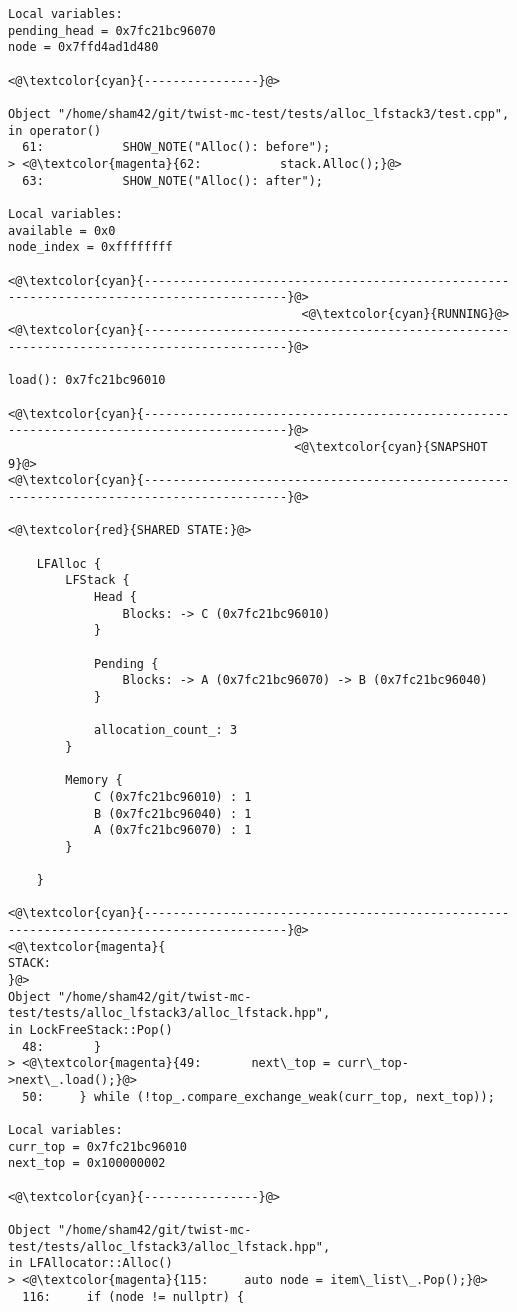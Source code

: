 \begin{adjustwidth}{-3.3cm}{-1cm}
\begin{allintypewriter}
\begin{multicols*}{2}
\begin{lstlisting}[numbers=none]
Local variables: 
pending_head = 0x7fc21bc96070
node = 0x7ffd4ad1d480

<@\textcolor{cyan}{----------------}@>

Object "/home/sham42/git/twist-mc-test/tests/alloc_lfstack3/test.cpp",
in operator()
  61:           SHOW_NOTE("Alloc(): before");
> <@\textcolor{magenta}{62:           stack.Alloc();}@>
  63:           SHOW_NOTE("Alloc(): after");

Local variables: 
available = 0x0
node_index = 0xffffffff

<@\textcolor{cyan}{------------------------------------------------------------------------------------------}@>
                                         <@\textcolor{cyan}{RUNNING}@>
<@\textcolor{cyan}{------------------------------------------------------------------------------------------}@>

load(): 0x7fc21bc96010

<@\textcolor{cyan}{------------------------------------------------------------------------------------------}@>
                                        <@\textcolor{cyan}{SNAPSHOT 9}@>
<@\textcolor{cyan}{------------------------------------------------------------------------------------------}@>

<@\textcolor{red}{SHARED STATE:}@>

    LFAlloc {
	    LFStack {
		    Head {
			    Blocks: -> C (0x7fc21bc96010) 
		    }

		    Pending {
			    Blocks: -> A (0x7fc21bc96070) -> B (0x7fc21bc96040) 
		    }

		    allocation_count_: 3
	    }

	    Memory {
		    C (0x7fc21bc96010) : 1
		    B (0x7fc21bc96040) : 1
		    A (0x7fc21bc96070) : 1
	    }

    }

<@\textcolor{cyan}{------------------------------------------------------------------------------------------}@>
<@\textcolor{magenta}{
STACK:
}@>
Object "/home/sham42/git/twist-mc-test/tests/alloc_lfstack3/alloc_lfstack.hpp",
in LockFreeStack::Pop()
  48:       }
> <@\textcolor{magenta}{49:       next\_top = curr\_top->next\_.load();}@>
  50:     } while (!top_.compare_exchange_weak(curr_top, next_top));

Local variables: 
curr_top = 0x7fc21bc96010
next_top = 0x100000002

<@\textcolor{cyan}{----------------}@>

Object "/home/sham42/git/twist-mc-test/tests/alloc_lfstack3/alloc_lfstack.hpp",
in LFAllocator::Alloc()
> <@\textcolor{magenta}{115:     auto node = item\_list\_.Pop();}@>
  116:     if (node != nullptr) {


\end{lstlisting}
\end{multicols*}
\end{allintypewriter}
\end{adjustwidth}
